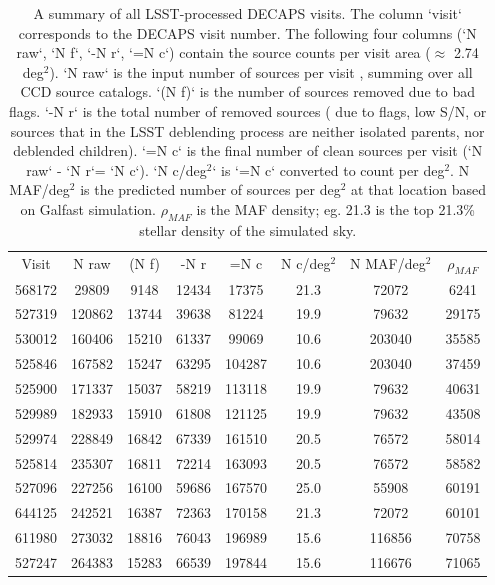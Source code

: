 \documentclass[DM,lsstdraft,toc,usenatbib]{lsstdoc}
\begin{document}
\begin{table}
\centering
\caption{A summary of all LSST-processed DECAPS visits. The column `visit` corresponds to the DECAPS visit number.  The following four columns (`N raw`,  `N f`, `-N r`,  `=N c`) contain the source counts  per visit area ($\approx$ 2.74 deg$^{2}$). `N raw` is the input number of sources per visit , summing over all CCD source catalogs. `(N f)` is the number of sources removed due to bad flags. `-N r` is the total number of removed sources ( due to flags, low S/N, or sources that in the LSST deblending process are neither isolated parents, nor deblended children). `=N c` is the final number of clean sources per  visit (`N raw` - `N r`= `N c`). `N c/deg$^{2}$` is `=N c` converted to count per deg$^{2}$. N MAF/deg$^{2}$ is the predicted number of sources per deg$^{2}$ at that location based on Galfast simulation. $\rho_{MAF}$ is the  MAF density; eg. 21.3 is the top 21.3\% stellar density of the simulated sky.}
\label{tab:lsst_summary}
\begin{tabular}{cccccccc}
Visit & N raw & (N f) & -N r & =N c & N c/deg$^{2}$ & N MAF/deg$^{2}$ & $\rho_{MAF}$ \\
568172 & 29809 & 9148 & 12434 & 17375 & 21.3 & 72072 & 6241 \\
527319 & 120862 & 13744 & 39638 & 81224 & 19.9 & 79632 & 29175 \\
530012 & 160406 & 15210 & 61337 & 99069 & 10.6 & 203040 & 35585 \\
525846 & 167582 & 15247 & 63295 & 104287 & 10.6 & 203040 & 37459 \\
525900 & 171337 & 15037 & 58219 & 113118 & 19.9 & 79632 & 40631 \\
529989 & 182933 & 15910 & 61808 & 121125 & 19.9 & 79632 & 43508 \\
529974 & 228849 & 16842 & 67339 & 161510 & 20.5 & 76572 & 58014 \\
525814 & 235307 & 16811 & 72214 & 163093 & 20.5 & 76572 & 58582 \\
527096 & 227256 & 16100 & 59686 & 167570 & 25.0 & 55908 & 60191 \\
644125 & 242521 & 16387 & 72363 & 170158 & 21.3 & 72072 & 60101 \\
611980 & 273032 & 18816 & 76043 & 196989 & 15.6 & 116856 & 70758 \\
527247 & 264383 & 15283 & 66539 & 197844 & 15.6 & 116676 & 71065 \\

\end{tabular}
\end{table}
\end{document}
